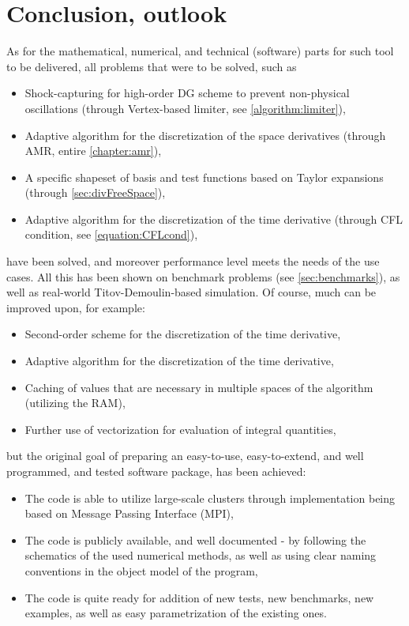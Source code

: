 \chapter{Conclusion, outlook}
As for the mathematical, numerical, and technical (software) parts for such tool to be delivered, all problems that were to be solved, such as
\begin{itemize}
	\item Shock-capturing for high-order DG scheme to prevent non-physical oscillations (through Vertex-based limiter, see \cref{algorithm:limiter}),
	\item Adaptive algorithm for the discretization of the space derivatives (through AMR, entire \cref{chapter:amr}),
	\item A specific shapeset of basis and test functions based on Taylor expansions (through \cref{sec:divFreeSpace}),
	\item Adaptive algorithm for the discretization of the time derivative (through CFL condition, see \cref{equation:CFLcond}),
\end{itemize}
have been solved, and moreover performance level meets the needs of the use cases. All this has been shown on benchmark problems (see \cref{sec:benchmarks}), as well as real-world Titov-Demoulin-based simulation.
\textit{}
Of course, much can be improved upon, for example:
\begin{itemize}
	\item Second-order scheme for the discretization of the time derivative,
	\item Adaptive algorithm for the discretization of the time derivative,
	\item Caching of values that are necessary in multiple spaces of the algorithm (utilizing the RAM),
	\item Further use of vectorization for evaluation of integral quantities,
\end{itemize}
but the original goal of preparing an easy-to-use, easy-to-extend, and well programmed, and tested software package, has been achieved:
\begin{itemize}
\item The code is able to utilize large-scale clusters through implementation being based on Message Passing Interface (MPI),
\item The code is publicly available, and well documented - by following the schematics of the used numerical methods, as well as using clear naming conventions in the object model of the program,
\item The code is quite ready for addition of new tests, new benchmarks, new examples, as well as easy parametrization of the existing ones.
\end{itemize}

